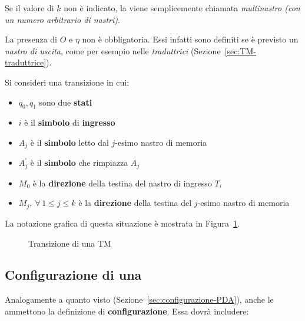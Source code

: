 \documentclass[italian, 10pt]{article}
\begin{document}
Se il valore di \(k\) non è indicato, la \TM viene semplicemente chiamata \TM \textit{multinastro (con un numero arbitrario di nastri)}.

La presenza di \(O\) e \(\eta\) non è obbligatoria.
Essi infatti sono definiti se è previsto un \textit{nastro di uscita}, come per esempio nelle \TM \textit{traduttrici} (Sezione~\ref{sec:TM-traduttrice}).

\bigskip
Si consideri una transizione in cui:

\begin{itemize}
  \item \(q_0, q_1\) sono due \textbf{stati}
  \item \(i\) è il \textbf{simbolo} di \textbf{ingresso}
  \item \(A_j\) è il \textbf{simbolo} letto dal \(j\)-esimo nastro di memoria
  \item \(A_j^\prime\) è il \textbf{simbolo} che rimpiazza \(A_j\)
  \item \(M_0\) è la \textbf{direzione} della testina del nastro di ingresso \(T_i\)
  \item \(M_j, \  \forall \, 1 \leq j \leq k\) è la \textbf{direzione} della testina del \(j\)-esimo nastro di memoria
\end{itemize}

La notazione grafica di questa situazione è mostrata in Figura~\ref{fig:esempio-transizione-TM}.

\begin{figure}[htbp]
  \bigskip
  \centering

  \caption{Transizione di una TM}
  \label{fig:esempio-transizione-TM}
  \bigskip
\end{figure}

\subsection{Configurazione di una \TM}

Analogamente a quanto visto \PDA (Sezione~\ref{sec:configurazione-PDA}), anche le \TM ammettono la definizione di \textbf{configurazione}.
Essa dovrà includere:
\end{document}
